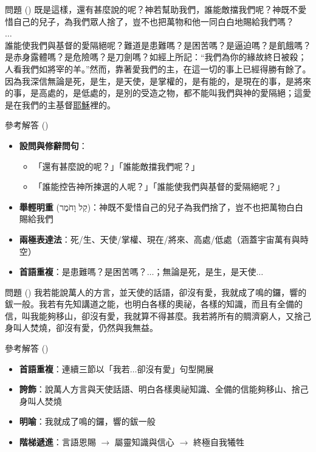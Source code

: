 \documentclass{beamer}
\begin{document}
\begin{frame}{問題 ()}
  既是這樣，還有甚麼說的呢？神若幫助我們，誰能敵擋我們呢？神既不愛惜自己的兒子，為我們眾人捨了，豈不也把萬物和他一同白白地賜給我們嗎？\\
  $\dots$\\
  誰能使我們與基督的愛隔絕呢？難道是患難嗎？是困苦嗎？是逼迫嗎？是飢餓嗎？是赤身露體嗎？是危險嗎？是刀劍嗎？如經上所記：“我們為你的緣故終日被殺；人看我們如將宰的羊。”然而，靠著愛我們的主，在這一切的事上已經得勝有餘了。因為我深信無論是死，是生，是天使，是掌權的，是有能的，是現在的事，是將來的事，是高處的，是低處的，是別的受造之物，都不能叫我們與神的愛隔絕；這愛是在我們的主基督\uline{耶穌}裡的。
\end{frame}

\begin{frame}{參考解答 ()}
  \begin{itemize}
    \item\textbf{設問與修辭問句}：
      \begin{itemize}
        \item 「還有甚麼說的呢？」「誰能敵擋我們呢？」
        \item 「誰能控告神所揀選的人呢？」「誰能使我們與基督的愛隔絕呢？」
      \end{itemize}
    \item\textbf{舉輕明重} (\texthebrew{קַל וָחֹמֶר})：神既不愛惜自己的兒子為我們捨了，豈不也把萬物白白賜給我們
    \item\textbf{兩極表達法}：死/生、天使/掌權、現在/將來、高處/低處（涵蓋宇宙萬有與時空）
    \item\textbf{首語重複}：是患難嗎？是困苦嗎？$\dots$；無論是死，是生，是天使$\dots$
  \end{itemize}
\end{frame}

\begin{frame}{問題 ()}
  我若能說萬人的方言，並天使的話語，卻沒有愛，我就成了鳴的鑼，響的鈸一般。我若有先知講道之能，也明白各樣的奧祕，各樣的知識，而且有全備的信，叫我能夠移山，卻沒有愛，我就算不得甚麼。我若將所有的賙濟窮人，又捨己身叫人焚燒，卻沒有愛，仍然與我無益。
\end{frame}

\begin{frame}{參考解答 ()}
  \begin{itemize}
    \item\textbf{首語重複}：連續三節以「我若$\dots$卻沒有愛」句型開展
    \item\textbf{誇飾}：說萬人方言與天使話語、明白各樣奧祕知識、全備的信能夠移山、捨己身叫人焚燒
    \item\textbf{明喻}：我就成了鳴的鑼，響的鈸一般
    \item\textbf{階梯遞進}：言語恩賜 $\to$ 屬靈知識與信心 $\to$ 終極自我犧牲
  \end{itemize}
\end{frame}
\end{document}
